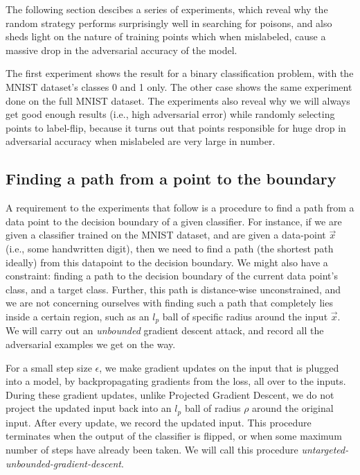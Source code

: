 \documentclass{ociamthesis}
\begin{document}
The following section descibes a series of experiments, which reveal why the
random strategy performs surprisingly well in searching for poisons, and also
sheds light on the nature of training points which when mislabeled, cause a
massive drop in the adversarial accuracy of the model.

The first experiment shows the result for a binary classification problem, with
the MNIST dataset's classes 0 and 1 only. The other case shows the same
experiment done on the full MNIST dataset. The experiments also reveal why we
will always get good enough results (i.e., high adversarial error) while
randomly selecting points to label-flip, because it turns out that points
responsible for huge drop in adversarial accuracy when mislabeled are very large
in number.

\subsection{Finding a path from a point to the boundary}

A requirement to the experiments that follow is a procedure to find a path from
a data point to the decision boundary of a given classifier. For instance, if we
are given a classifier trained on the MNIST dataset, and are given a data-point
$\vec{x}$ (i.e., some handwritten digit), then we need to find a path (the
shortest path ideally) from this datapoint to the decision boundary. We might
also have a constraint: finding a path to the decision boundary of the current
data point's class, and a target class. Further, this path is distance-wise
unconstrained, and we are not concerning ourselves with finding such a path that
completely lies inside a certain region, such as an $l_p$ ball of specific
radius around the input $\vec{x}$. We will carry out an \emph{unbounded}
gradient descent attack, and record all the adversarial examples we get on the
way.

For a small step size $\epsilon$, we make gradient updates on the input that is
plugged into a model, by backpropagating gradients from the loss, all over to
the inputs. During these gradient updates, unlike Projected Gradient Descent, we
do not project the updated input back into an $l_p$ ball of radius $\rho$ around
the original input. After every update, we record the updated input. This
procedure terminates when the output of the classifier is flipped, or when some
maximum number of steps have already been taken. We will call this procedure
\emph{untargeted-unbounded-gradient-descent}.
\end{document}
